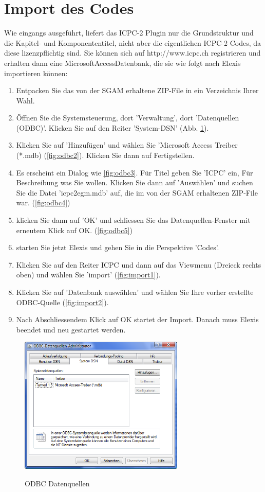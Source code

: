 \documentclass[a4paper]{scrartcl}
\begin{document}
\newpage

\appendix
\section{Import des Codes}
Wie eingangs ausgeführt, liefert das ICPC-2 Plugin nur die Grundstruktur und die Kapitel- und Komponententitel, nicht aber die eigentlichen ICPC-2 Codes, da diese lizenzpflichtig sind.  Sie können sich auf http://www.icpc.ch registrieren und erhalten dann eine Microsoft\texttrademark Access\texttrademark Datenbank, die sie wie folgt nach Elexis importieren können:
\begin{enumerate}
\item Entpacken Sie das von der SGAM erhaltene ZIP-File in ein Verzeichnis Ihrer Wahl.
\item Öffnen Sie die Systemsteuerung, dort 'Verwaltung', dort 'Datenquellen (ODBC)'. Klicken Sie auf den Reiter 'System-DSN' (Abb. \ref{fig:odbc1}).
\item Klicken Sie auf 'Hinzufügen' und wählen Sie 'Microsoft Access Treiber (*.mdb) (\ref{fig:odbc2}). Klicken Sie dann auf Fertigstellen.
\item Es erscheint ein Dialog wie \ref{fig:odbc3}. Für Titel geben Sie 'ICPC' ein, Für Beschreibung was Sie wollen. Klicken Sie dann auf 'Auswählen' und suchen Sie die Datei 'icpc2egm.mdb' auf, die im von der SGAM erhaltenen ZIP-File war. (\ref{fig:odbc4})
\item klicken Sie dann auf 'OK' und schliessen Sie das Datenquellen-Fenster mit erneutem Klick auf OK. (\ref{fig:odbc5})
\item starten Sie jetzt Elexis und gehen Sie in die Perspektive 'Codes'.
\item Klicken Sie auf den Reiter ICPC und dann auf das Viewmenu (Dreieck rechts oben) und wählen Sie 'import' (\ref{fig:import1}).
\item Klicken Sie auf 'Datenbank auswählen' und wählen Sie Ihre vorher erstellte ODBC-Quelle (\ref{fig:import2}).
\item Nach Abschliessendem Klick auf OK startet der Import. Danach muss Elexis beendet und neu gestartet werden.


\end{enumerate}
\begin{figure}
  \center
  \includegraphics[width=0.7\textwidth]{icpc5}\\
  \caption{ODBC Datenquellen}\label{fig:odbc1}
\end{figure}
\end{document}
